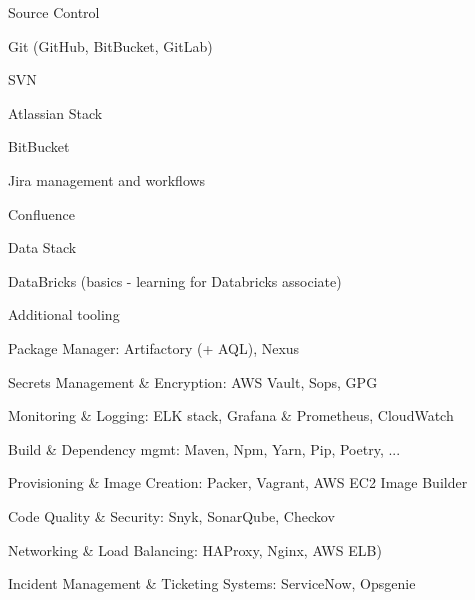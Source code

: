 \begin{cvskills}
  \cvskill
    {Source Control} %
    {
      \begin{cvitems} %
        \item {Git (GitHub, BitBucket, GitLab)} %
        \item {SVN} %
      \end{cvitems}
    }

  \cvskill
    {Atlassian Stack} %
    {
      \begin{cvitems} %
        \item {BitBucket} %
        \item {Jira management and workflows} %
        \item {Confluence} %
      \end{cvitems}
    }

  \cvskill
    {Data Stack} %
    {
      \begin{cvitems} %
        \item {DataBricks (basics - learning for Databricks associate)} %
      \end{cvitems}
    }

  \cvskill
    {Additional tooling} %
    {
      \begin{cvitems} %
        \item {Package Manager: Artifactory (+ AQL), Nexus} %
        \item {Secrets Management \& Encryption: AWS Vault, Sops, GPG} %
        \item {Monitoring \& Logging: ELK stack, Grafana \& Prometheus, CloudWatch} %
        \item {Build \& Dependency mgmt: Maven, Npm, Yarn, Pip, Poetry, ...} %
        \item {Provisioning \& Image Creation: Packer, Vagrant, AWS EC2 Image Builder} %
        \item {Code Quality \& Security: Snyk, SonarQube, Checkov} %
        \item {Networking \& Load Balancing: HAProxy, Nginx, AWS ELB)} %
        \item {Incident Management \& Ticketing Systems: ServiceNow, Opsgenie} %
      \end{cvitems}
    }


\end{cvskills}

